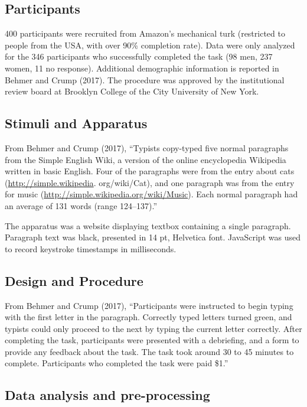 \documentclass[floatsintext,man]{apa6}
\theoremstyle{definition}
\theoremstyle{definition}
\theoremstyle{definition}
\theoremstyle{remark}
\begin{document}
\subsection{Participants}\label{participants}

400 participants were recruited from Amazon's mechanical turk
(restricted to people from the USA, with over 90\% completion rate).
Data were only analyzed for the 346 participants who successfully
completed the task (98 men, 237 women, 11 no response). Additional
demographic information is reported in Behmer and Crump (2017). The
procedure was approved by the institutional review board at Brooklyn
College of the City University of New York.

\subsection{Stimuli and Apparatus}\label{stimuli-and-apparatus}

From Behmer and Crump (2017), \enquote{Typists copy-typed five normal
paragraphs from the Simple English Wiki, a version of the online
encyclopedia Wikipedia written in basic English. Four of the paragraphs
were from the entry about cats (\url{http://simple.wikipedia}.
org/wiki/Cat), and one paragraph was from the entry for music
(\url{http://simple.wikipedia.org/wiki/Music}). Each normal paragraph
had an average of 131 words (range 124--137).}

The apparatus was a website displaying textbox containing a single
paragraph. Paragraph text was black, presented in 14 pt, Helvetica font.
JavaScript was used to record keystroke timestamps in milliseconds.

\subsection{Design and Procedure}\label{design-and-procedure}

From Behmer and Crump (2017), \enquote{Participants were instructed to
begin typing with the first letter in the paragraph. Correctly typed
letters turned green, and typists could only proceed to the next by
typing the current letter correctly. After completing the task,
participants were presented with a debriefing, and a form to provide any
feedback about the task. The task took around 30 to 45 minutes to
complete. Participants who completed the task were paid \$1.}

\subsection{Data analysis and
pre-processing}\label{data-analysis-and-pre-processing}
\end{document}

